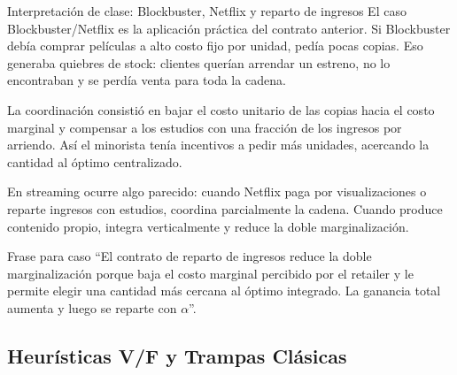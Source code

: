 \begin{ejercicio}{Interpretación de clase: Blockbuster, Netflix y reparto de ingresos}
El caso Blockbuster/Netflix es la aplicación práctica del contrato anterior. Si Blockbuster debía comprar películas a alto costo fijo por unidad, pedía pocas copias. Eso generaba quiebres de stock: clientes querían arrendar un estreno, no lo encontraban y se perdía venta para toda la cadena.

La coordinación consistió en bajar el costo unitario de las copias hacia el costo marginal y compensar a los estudios con una fracción de los ingresos por arriendo. Así el minorista tenía incentivos a pedir más unidades, acercando la cantidad al óptimo centralizado.

En streaming ocurre algo parecido: cuando Netflix paga por visualizaciones o reparte ingresos con estudios, coordina parcialmente la cadena. Cuando produce contenido propio, integra verticalmente y reduce la doble marginalización.
\end{ejercicio}

\begin{tipprueba}{Frase para caso}
``El contrato de reparto de ingresos reduce la doble marginalización porque baja el costo marginal percibido por el retailer y le permite elegir una cantidad más cercana al óptimo integrado. La ganancia total aumenta y luego se reparte con \(\alpha\)''.
\end{tipprueba}

\subsection{Heurísticas V/F y Trampas Clásicas}

